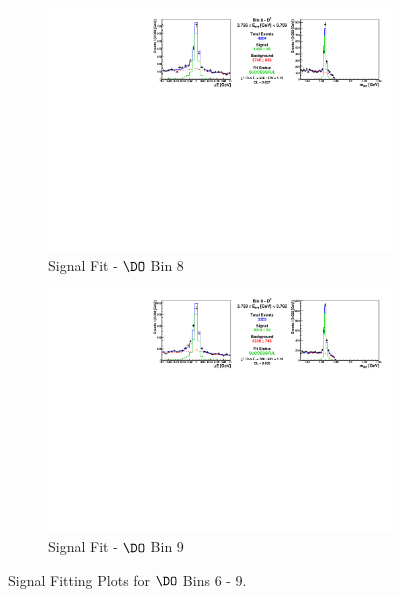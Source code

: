 \begin{figure}[h]
\begin{subfigure}[c]{0.99\textwidth}
\includegraphics[width=\textwidth]{figures/plots/fit_results/D0_bin_08.pdf}
\caption*{Signal Fit - $\DO$ Bin 8}
\end{subfigure}

\vspace{5pt}

\begin{subfigure}[c]{0.99\textwidth}
\includegraphics[width=\textwidth]{figures/plots/fit_results/D0_bin_09.pdf}
\caption*{Signal Fit - $\DO$ Bin 9}
\end{subfigure}

\caption{Signal Fitting Plots for $\DO$ Bins 6 - 9.}
\label{fig:DO_plots_6_9}

\end{figure}


